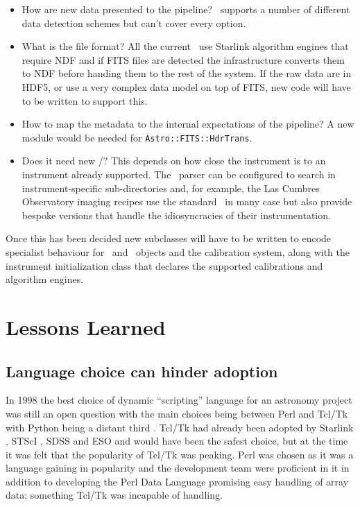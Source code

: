 \documentclass[final,authoryear,5p,times,twocolumn]{elsarticle}
\begin{document}
\begin{itemize}

\item How are new data presented to the pipeline? \oracdr\ supports a
  number of different data detection schemes but can't cover every option.

\item What is the file format? All the current \recipes\ use Starlink
  algorithm engines that require NDF \citep{ndfjenness} and if FITS
  files are detected the infrastructure converts them to NDF before
  handing them to the rest of the system. If the raw data are in HDF5,
  or use a very complex data model on top of FITS, new code will have
  to be written to support this.

\item How to map the metadata to the internal expectations of the
  pipeline? A new module would be needed for \texttt{Astro::FITS::HdrTrans}.

\item Does it need new \recipes/\primitives? This depends on how close
  the instrument is to an instrument already supported. The \recipe\
  parser can be configured to search in instrument-specific
  sub-directories and, for example, the Las Cumbres Observatory
  imaging recipes use the standard \primitives\ in many case but also
  provide bespoke versions that handle the idiosyncracies of their
  instrumentation.

\end{itemize}

Once this has been decided new subclasses will have to be written to
encode specialist behaviour for \Frame\ and \Group\ objects and the
calibration system, along with the instrument initialization class
that declares the supported calibrations and algorithm engines.

\section{Lessons Learned}

\subsection{Language choice can hinder adoption}

In 1998 the best choice of dynamic ``scripting'' language for an astronomy project was
still an open question with the main choices being between Perl and
Tcl/Tk with Python being a distant third
\citep{1995ComPh...9...57A,1999ASPC..172..494J,1999ASPC..172..483B,2000ASPC..216...91J}.
Tcl/Tk had already been adopted by Starlink
\citep{1995ASPC...77..395T}, STScI \citep{1998SPIE.3349...89D},
SDSS \citep{1996ASPC..101..248S} and ESO \citep{1996ASPC..101..396H,1995ASPC...77...58C} and
would have been the safest choice, but at the time it was felt that
the popularity of Tcl/Tk was peaking. Perl was chosen as it was a language
gaining in popularity and the development team were proficient in
it in addition to developing the Perl Data Language \citep[PDL;][]{PDL}
promising easy handling of array data; something Tcl/Tk was incapable
of handling.
\end{document}
